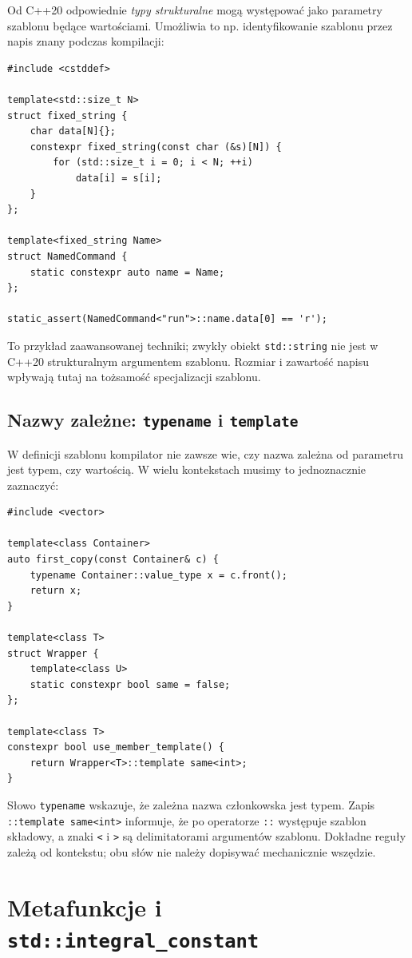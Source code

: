 Od C++20 odpowiednie \emph{typy strukturalne} mogą występować jako
parametry szablonu będące wartościami. Umożliwia to np. identyfikowanie
szablonu przez napis znany podczas kompilacji:

\begin{lstlisting}
#include <cstddef>

template<std::size_t N>
struct fixed_string {
    char data[N]{};
    constexpr fixed_string(const char (&s)[N]) {
        for (std::size_t i = 0; i < N; ++i)
            data[i] = s[i];
    }
};

template<fixed_string Name>
struct NamedCommand {
    static constexpr auto name = Name;
};

static_assert(NamedCommand<"run">::name.data[0] == 'r');
\end{lstlisting}

To przykład zaawansowanej techniki; zwykły obiekt \texttt{std::string}
nie jest w C++20 strukturalnym argumentem szablonu. Rozmiar i
zawartość napisu wpływają tutaj na tożsamość specjalizacji szablonu.

\subsection{Nazwy zależne: \texttt{typename} i \texttt{template}}

W definicji szablonu kompilator nie zawsze wie, czy nazwa zależna od
parametru jest typem, czy wartością. W wielu kontekstach musimy to
jednoznacznie zaznaczyć:

\begin{lstlisting}
#include <vector>

template<class Container>
auto first_copy(const Container& c) {
    typename Container::value_type x = c.front();
    return x;
}

template<class T>
struct Wrapper {
    template<class U>
    static constexpr bool same = false;
};

template<class T>
constexpr bool use_member_template() {
    return Wrapper<T>::template same<int>;
}
\end{lstlisting}

Słowo \texttt{typename} wskazuje, że zależna nazwa członkowska
jest typem. Zapis \texttt{::template same<int>} informuje,
że po operatorze \texttt{::} występuje szablon składowy, a znaki
\texttt{<} i \texttt{>} są delimitatorami argumentów szablonu.
Dokładne reguły zależą od kontekstu; obu słów nie należy dopisywać
mechanicznie wszędzie.

\section{Metafunkcje i \texttt{std::integral\_constant}}
\label{sec:cpp9-integral-constant}

